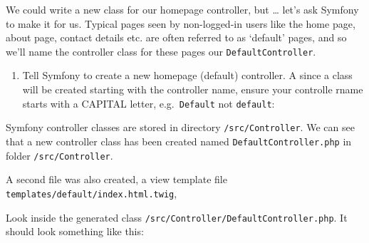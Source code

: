 \documentclass[a4paperpaper,openright]{book}
\newenvironment{Shaded}{}{}
\newcommand{\ExtensionTok}[1]{#1}
\newcommand{\NormalTok}[1]{#1}
\providecommand{\tightlist}{%
  \setlength{\itemsep}{0pt}\setlength{\parskip}{0pt}}
\begin{document}
We could write a new class for our homepage controller, but \ldots{}
let's ask Symfony to make it for us. Typical pages seen by non-logged-in
users like the home page, about page, contact details etc. are often
referred to as `default' pages, and so we'll name the controller class
for these pages our \texttt{DefaultController}.

\begin{enumerate}
\def\labelenumi{\arabic{enumi}.}
\tightlist
\item
  Tell Symfony to create a new homepage (default) controller. A since a
  class will be created starting with the controller name, ensure your
  controlle rname starts with a CAPITAL letter, e.g.~\texttt{Default}
  not \texttt{default}:
\end{enumerate}

\begin{Shaded}
\end{Shaded}

Symfony controller classes are stored in directory
\texttt{/src/Controller}. We can see that a new controller class has
been created named \texttt{DefaultController.php} in folder
\texttt{/src/Controller}.

A second file was also created, a view template file
\texttt{templates/default/index.html.twig},

Look inside the generated class
\texttt{/src/Controller/DefaultController.php}. It should look something
like this:
\end{document}
